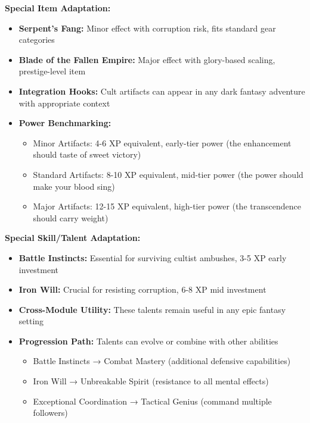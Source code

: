 \documentclass[11pt]{article}
\begin{document}
\begin{itemize}
\textbf{Special Item Adaptation:}
\begin{itemize}
\item \textbf{Serpent's Fang:} Minor effect with corruption risk, fits standard gear categories
\item \textbf{Blade of the Fallen Empire:} Major effect with glory-based scaling, prestige-level item
\item \textbf{Integration Hooks:} Cult artifacts can appear in any dark fantasy adventure with appropriate context
\item \textbf{Power Benchmarking:} 
  \begin{itemize}
  \item Minor Artifacts: 4-6 XP equivalent, early-tier power (the enhancement should taste of sweet victory)
  \item Standard Artifacts: 8-10 XP equivalent, mid-tier power (the power should make your blood sing)
  \item Major Artifacts: 12-15 XP equivalent, high-tier power (the transcendence should carry weight)
  \end{itemize}
\end{itemize}

\textbf{Special Skill/Talent Adaptation:}
\begin{itemize}
\item \textbf{Battle Instincts:} Essential for surviving cultist ambushes, 3-5 XP early investment
\item \textbf{Iron Will:} Crucial for resisting corruption, 6-8 XP mid investment
\item \textbf{Cross-Module Utility:} These talents remain useful in any epic fantasy setting
\item \textbf{Progression Path:} Talents can evolve or combine with other abilities
  \begin{itemize}
  \item Battle Instincts → Combat Mastery (additional defensive capabilities)
  \item Iron Will → Unbreakable Spirit (resistance to all mental effects)
  \item Exceptional Coordination → Tactical Genius (command multiple followers)
  \end{itemize}
\end{itemize}


\end{itemize}
\end{document}
